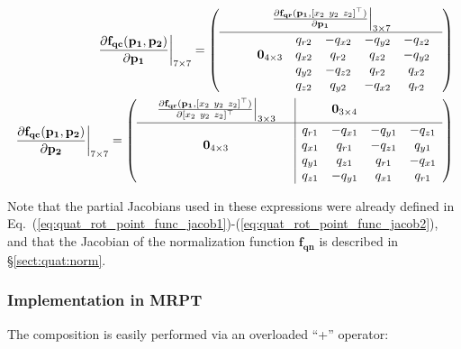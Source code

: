 \documentclass[a4paper,11pt]{report}
\begin{document}
\begin{eqnarray}
\label{eq:jacob_f_qc}
\left. 
\frac{\partial \mathbf{f_{qc}}(\mathbf{p_1},\mathbf{p_2}) }{\partial \mathbf{p_1}} 
\right|_{7 \times 7} 
= 
\left(
  \begin{array}{c}
     \left. \frac{\partial \mathbf{f_{qr}} (\mathbf{p_1}, [ x_2 ~ y_2 ~ z_2]^\top ) }{\partial \mathbf{p_1}} \right|_{3\times 7} \\ \hline
  \begin{array}{ccccccc}
    &  &  			& q_{r2} &-q_{x2} &-q_{y2} &-q_{z2}  \\
    & & \mathbf{0}_{4\times 3}  	& q_{x2} & q_{r2} & q_{z2} &-q_{y2}  \\
    & &  			& q_{y2} &-q_{z2} & q_{r2} & q_{x2}  \\
    & &  			& q_{z2} & q_{y2} &-q_{x2} & q_{r2}   
  \end{array}
  \end{array}
\right) 
\\
\left. 
\frac{\partial \mathbf{f_{qc}}(\mathbf{p_1},\mathbf{p_2}) }{\partial \mathbf{p_2}} 
\right|_{7 \times 7} 
= 
\left(
  \begin{array}{ccc|cccc}
     & \left. 
	\frac{\partial \mathbf{f_{qr}} (\mathbf{p_1}, [ x_2 ~ y_2 ~ z_2]^\top ) }{\partial [ x_2 ~ y_2 ~ z_2]^\top} \right|_{3\times 3} 
      &  & & \mathbf{0}_{3 \times 4}  \\ \hline
   & & 				& q_{r1} &-q_{x1} &-q_{y1} &-q_{z1}  \\
   & \mathbf{0}_{4\times 3} &	& q_{x1} & q_{r1} &-q_{z1} & q_{y1}  \\
   & & 				& q_{y1} & q_{z1} & q_{r1} &-q_{x1}  \\
   & & 				& q_{z1} &-q_{y1} & q_{x1} & q_{r1}   
  \end{array}
\right)
\end{eqnarray}


Note that the partial Jacobians used in these expressions were already defined 
in Eq.~(\ref{eq:quat_rot_point_func_jacob1})-(\ref{eq:quat_rot_point_func_jacob2}),
and that the Jacobian of the normalization function $\mathbf{f_{qn}}$ is described
in \S \ref{sect:quat:norm}.



\subsubsection{Implementation in MRPT}

The composition is easily performed via an overloaded ``+'' operator:
\end{document}
